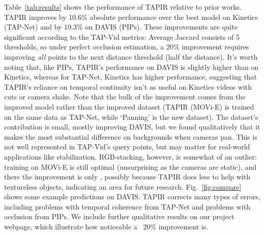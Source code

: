 \documentclass[10pt,twocolumn,letterpaper]{article}
\begin{document}
Table~\ref{tab:results} shows the performance of TAPIR relative to prior works.  TAPIR improves by 10.6\% absolute performance over the best model on Kinetics (TAP-Net) and by 19.3\% on DAVIS (PIPs).  These improvements are quite significant according to the TAP-Vid metrics: Average Jaccard consists of 5 thresholds, so under perfect occlusion estimation, a 20\% improvement requires improving \textit{all} points to the next distance threshold (half the distance). It's worth noting that, like PIPs, TAPIR's performance on DAVIS is slightly higher than on Kinetics, whereas for TAP-Net, Kinetics has higher performance, suggesting that TAPIR's reliance on temporal continuity isn't as useful on Kinetics videos with cuts or camera shake.  Note that the bulk of the improvement comes from the improved model rather than the improved dataset (TAPIR (MOVi-E) is trained on the same data as TAP-Net, while `Panning' is the new dataset).  The dataset's contribution is small, mostly improving DAVIS, but we found qualitatively that it makes the most substantial difference on backgrounds when cameras pan.  This is not well represented in TAP-Vid's query points, but may matter for real-world applications like stabilization.  RGB-stacking, however, is somewhat of an outlier: training on MOVi-E is still optimal (unsurprising as the cameras are static), and there the improvement is only , possibly because TAPIR does less to help with textureless objects, indicating an area for future research. Fig.~\ref{fig:compare} shows some example predictions on DAVIS.  TAPIR corrects many types of errors, including problems with temporal coherence from TAP-Net and problems with occlusion from PIPs. We include further qualitative results on our project webpage, which illustrate how noticeable a ~20\% improvement is. 

\begin{table}[t]
\caption{\textbf{Comparison under query first metrics.}  We see largely the same relative performance trend whether the model is queried in a `strided' fashion or whether the model is queried with the first frame where the point appeared, although performance is overall lower than the `strided' evaluation. }
\label{tab:query_first_compare}
\end{table}
\end{document}
